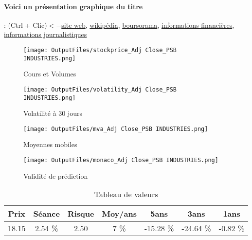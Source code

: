 \documentclass[11pt,a4paper]{report}%
\begin{document}
\paragraph{Voici un présentation graphique du titre} : (Ctrl + Clic)$<-$\href{http://www.psbindus.com/}{site web}, \href{https://fr.wikipedia.org/wiki/PSB_Industries}{wikipédia}, \href{https://www.boursorama.com/cours/1rPPSB}{boursorama}, \href{https://www.qwant.com/?q=site:https:%2f%2fwww.easybourse.com%2faction-societe%2fPSB-INDUSTRIES&t=web&client=ext-firefox-hp}{informations financières}, \href{https://bourse.lerevenu.com/cours-de-bourse/fiche-valeur-synthese/PSB-INDUSTRIES/PSB-FR}{informations journalistiques}
\begin{figure}[!htb]
   \begin{minipage}{0.5\textwidth}
     \centering
     \texttt{[image: OutputFiles/stockprice\_Adj Close\_PSB INDUSTRIES.png]}
     \caption{Cours et Volumes}\label{Fig:price_PSB INDUSTRIES}
   \end{minipage}\hfill
   \begin{minipage}{0.5\textwidth}
     \centering
     \texttt{[image: OutputFiles/volatility\_Adj Close\_PSB INDUSTRIES.png]}
     \caption{Volatilité à 30 jours}\label{Fig:volat_PSB INDUSTRIES}
   \end{minipage}
\end{figure}
\begin{figure}[!htb]
   \begin{minipage}{0.5\textwidth}
     \centering
     \texttt{[image: OutputFiles/mva\_Adj Close\_PSB INDUSTRIES.png]}
     \caption{Moyennes mobiles}\label{Fig:mva_PSB INDUSTRIES}
   \end{minipage}\hfill
   \begin{minipage}{0.5\textwidth}
     \centering
     \texttt{[image: OutputFiles/monaco\_Adj Close\_PSB INDUSTRIES.png]}
     \caption{Validité de prédiction}\label{Fig:prediction_PSB INDUSTRIES}
   \end{minipage}
\end{figure}

\begin{table}[H]
  \centering
    \begin{tabular}{|c|c|c|c|c|c|c|}
    \hline
    Prix & Séance & Risque  & Moy/ans & 5ans & 3ans & 1ans \\
    \hline
    18.15 &    2.54 \%    & 2.50 & 7 \% & -15.28 \% & -24.64 \% & -0.82 \% \\
    \hline
    \end{tabular}%
        \label{tab:table_PSB INDUSTRIES}%
      \caption{Tableau de valeurs}
\end{table}%
\end{document}
